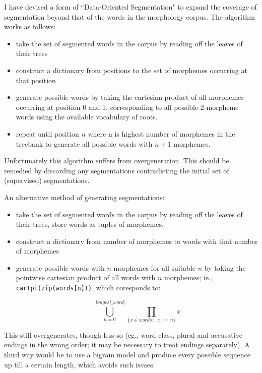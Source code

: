 \documentclass[10pt,a4paper]{article}
\begin{document}
I have devised a form of ``Data-Oriented Segmentation" to expand the
coverage of segmentation beyond that of the words in the morphology corpus. The
algorithm works as follows:

\begin{itemize}
\item take the set of segmented words in the corpus by reading off the leaves
of their trees

\item construct a dictionary from positions to the set of morphemes occurring
at that position

\item generate possible words by taking the cartesian product of all morphemes
occurring at position 0 and 1, corresponding to all possible 2-morpheme words
using the available vocabulary of roots.

\item repeat until position $n$ where n is highest number of morphemes in the
treebank to generate all possible words with $n+1$ morphemes.

\end{itemize}

Unfortunately this algorithm suffers from overgeneration. This should be
remedied by discarding any segmentations contradicting the initial set of
(supervised) segmentations. 

An alternative method of generating segmentations:

\begin{itemize}
\item take the set of segmented words in the corpus by reading off the leaves
of their trees, store words as tuples of morphemes.

\item construct a dictionary from number of morphemes to words with that number
of morphemes

\item generate possible words with $n$ morphemes for all suitable $n$ by taking
the pointwise cartesian product of all words with $n$ morphemes; ie.,
\texttt{cartpi(zip(words[n]))}, which coresponds to:

\[ \displaystyle\bigcup_{n=0}^{\vert longest\_word\vert}\prod_{\{x \in words \: : \: \vert x\vert \, = \, n\}} x \]


\end{itemize}

This still overgenerates, though less so (eg., word class, plural and
accusative endings in the wrong order; it may be necessary to treat endings
separately). A third way would be to use a bigram model and produce every
possible sequence up till a certain length, which avoids such issues.
\end{document}
